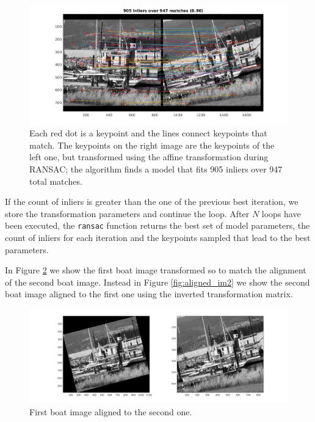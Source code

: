\documentclass[11pt]{article}
\begin{document}
\begin{figure}[htpb]
	\centering
	\includegraphics[width=1\textwidth]{imgs/transformed_matches.jpg}
	\caption{Each red dot is a keypoint and the lines connect keypoints that
	match. The keypoints on the right image are the keypoints of the left one, but
	transformed using the affine transformation during RANSAC; the algorithm finds
	a model that fits 905 inliers over 947 total matches.}
	\label{fig:ransac_inliers}
\end{figure}

If the count of inliers is greater than the one of the previous best iteration,
we store the transformation parameters and continue the loop. After $N$ loops
have been executed, the \texttt{ransac} function returns the best set of model
parameters, the count of inliers for each iteration and the keypoints sampled
that lead to the best parameters.

In Figure \ref{fig:aligned_im1} we show the first boat image transformed so to
match the alignment of the second boat image. Instead in Figure
\ref{fig:aligned_im2} we show the second boat image aligned to the first one
using the inverted transformation matrix.

\begin{figure}[htpb]
	\centering
	\includegraphics[width=1\textwidth]{imgs/aligned_im1.jpg}
	\caption{First boat image aligned to the second one.}
	\label{fig:aligned_im1}
\end{figure}
\end{document}
